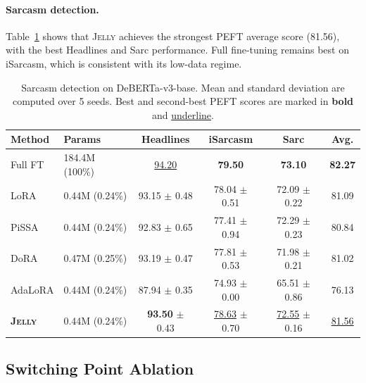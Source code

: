 \documentclass{article}
\newcommand{\jelly}{\textsc{Jelly}}
\begin{document}
\paragraph{Sarcasm detection.}
Table~\ref{tab:sarcasm} shows that \jelly{} achieves the strongest PEFT average score (81.56), with the best Headlines and Sarc performance.
Full fine-tuning remains best on iSarcasm, which is consistent with its low-data regime.

\begin{table}[!ht]
\caption{Sarcasm detection on DeBERTa-v3-base. Mean and standard deviation are computed over 5 seeds. Best and second-best PEFT scores are marked in \textbf{bold} and \underline{underline}.}
\label{tab:sarcasm}
\centering
\footnotesize
\renewcommand{\arraystretch}{1.2}
\setlength{\tabcolsep}{7pt}
\begin{tabular}{llcccc}
\toprule
\textbf{Method} & \textbf{Params} & \textbf{Headlines} & \textbf{iSarcasm} & \textbf{Sarc} & \textbf{Avg.} \\
\midrule
Full FT            & 184.4M (100\%) & \underline{94.20} & \textbf{79.50} & \textbf{73.10} & \textbf{82.27} \\
LoRA              & 0.44M (0.24\%) & 93.15 \scriptsize{$\pm$ 0.48} & 78.04 \scriptsize{$\pm$ 0.51} & 72.09 \scriptsize{$\pm$ 0.22} & 81.09 \\
PiSSA             & 0.44M (0.24\%) & 92.83 \scriptsize{$\pm$ 0.65} & 77.41 \scriptsize{$\pm$ 0.94} & 72.29 \scriptsize{$\pm$ 0.23} & 80.84 \\
DoRA              & 0.47M (0.25\%) & 93.19 \scriptsize{$\pm$ 0.47} & 77.81 \scriptsize{$\pm$ 0.53} & 71.98 \scriptsize{$\pm$ 0.21} & 81.02 \\
AdaLoRA           & 0.44M (0.24\%) & 87.94 \scriptsize{$\pm$ 0.35} & 74.93 \scriptsize{$\pm$ 0.00} & 65.51 \scriptsize{$\pm$ 0.86} & 76.13 \\
\midrule
\rowcolor[gray]{.95}\textbf{\jelly{}} & 0.44M (0.24\%) & \textbf{93.50} \scriptsize{$\pm$ 0.43} & \underline{78.63} \scriptsize{$\pm$ 0.70} & \underline{72.55} \scriptsize{$\pm$ 0.16} & \underline{81.56} \\
\bottomrule
\end{tabular}
\end{table}

\subsection{Switching Point Ablation}
\label{sec:ablation}
\end{document}

